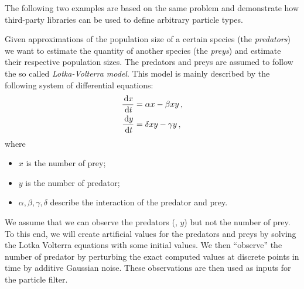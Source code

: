 The following two examples are based on the same problem and
demonstrate how third-party libraries can be used to define arbitrary
particle types.

\begin{example}\label{ex:lv1}
  Given approximations of the population size of a certain species
  (the \emph{predators}) we want to estimate the quantity of another
  species (the \emph{preys}) and estimate their respective population
  sizes. The predators and preys are assumed to follow the so called
  \emph{Lotka-Volterra model}. This model is mainly described by the
  following system of differential equations:
  \begin{equation}
    \label{eq:lotka}
    \begin{aligned}
      \frac{\,\mathrm{d}x}{\,\mathrm{d}t} &= \alpha x - \beta xy \,, \\
      \frac{\,\mathrm{d}y}{\,\mathrm{d}t} &= \delta xy - \gamma y \,,
    \end{aligned}
  \end{equation}
  where
  \begin{itemize}
  \item $x$ is the number of prey;
  \item $y$ is the number of predator;
  \item $\alpha, \beta, \gamma, \delta$ describe the interaction of
    the predator and prey.
  \end{itemize}
  We assume that we can observe the predators (\ie, $y$) but not the
  number of prey. To this end, we will create artificial values for
  the predators and preys by solving the Lotka Volterra equations with
  some initial values. We then ``observe'' the number of predator by
  perturbing the exact computed values at discrete points in time by
  additive Gaussian noise. These observations are then used as inputs
  for the particle filter.


\end{example}
